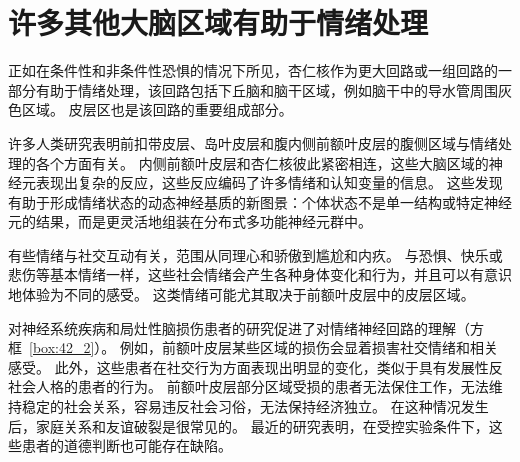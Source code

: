 \section{许多其他大脑区域有助于情绪处理}

正如在条件性和非条件性恐惧的情况下所见，杏仁核作为更大回路或一组回路的一部分有助于情绪处理，该回路包括下丘脑和脑干区域，例如脑干中的导水管周围灰色区域。
皮层区也是该回路的重要组成部分。


许多人类研究表明前扣带皮层、岛叶皮层和腹内侧前额叶皮层的腹侧区域与情绪处理的各个方面有关。
内侧前额叶皮层和杏仁核彼此紧密相连，这些大脑区域的神经元表现出复杂的反应，这些反应编码了许多情绪和认知变量的信息。
这些发现有助于形成情绪状态的动态神经基质的新图景：个体状态不是单一结构或特定神经元的结果，而是更灵活地组装在分布式多功能神经元群中。


有些情绪与社交互动有关，范围从同理心和骄傲到尴尬和内疚。
与恐惧、快乐或悲伤等基本情绪一样，这些社会情绪会产生各种身体变化和行为，并且可以有意识地体验为不同的感受。
这类情绪可能尤其取决于前额叶皮层中的皮层区域。


对神经系统疾病和局灶性脑损伤患者的研究促进了对情绪神经回路的理解（方框~\ref{box:42_2}）。
例如，前额叶皮层某些区域的损伤会显着损害社交情绪和相关感受。
此外，这些患者在社交行为方面表现出明显的变化，类似于具有发展性反社会人格的患者的行为。
前额叶皮层部分区域受损的患者无法保住工作，无法维持稳定的社会关系，容易违反社会习俗，无法保持经济独立。
在这种情况发生后，家庭关系和友谊破裂是很常见的。
最近的研究表明，在受控实验条件下，这些患者的道德判断也可能存在缺陷。


